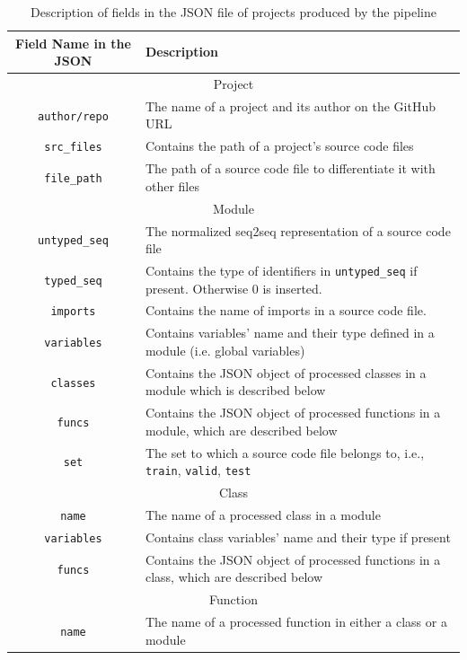 \documentclass[10pt, conference]{IEEEtran}
\begin{document}
\begin{table}[t]
	\centering
	\caption{Description of fields in the JSON file of projects produced by the pipeline}
	\label{tab:json-fields}
	\begin{tabular}{c l}
		\toprule
		Field Name in the JSON & Description \\
		\midrule
		\multicolumn{2}{c}{Project}  \\
		\midrule
		\texttt{author/repo} & The name of a project and its author on the GitHub URL  \\
		\midrule
		\texttt{src\_files} & Contains the path of a project's source code files \\
		\midrule
		\texttt{file\_path} & The path of a source code file to differentiate it with other files \\
		\midrule
		\multicolumn{2}{c}{Module}  \\
		\midrule
		\texttt{untyped\_seq} & The normalized seq2seq representation of a source code file \\
		\midrule
		\texttt{typed\_seq} & Contains the type of identifiers in \texttt{untyped\_seq} if present. Otherwise $0$ is inserted. \\
		\midrule
		\texttt{imports} & Contains the name of imports in a source code file. \\
		\midrule
		\texttt{variables} & Contains variables' name and their type defined in a module (i.e. global variables) \\
		\midrule
		\texttt{classes} & Contains the JSON object of processed classes in a module which is described below \\
		\midrule
		\texttt{funcs} &  Contains the JSON object of processed functions in a module, which are described below \\
		\midrule
		\texttt{set} & The set to which a source code file belongs to, i.e., \texttt{train}, \texttt{valid}, \texttt{test} \\
		\midrule
		\multicolumn{2}{c}{Class} \\
		\midrule
		\texttt{name} & The name of a processed class in a module \\
		\midrule
		\texttt{variables} & Contains class variables' name and their type if present \\
		\midrule
		\texttt{funcs} & Contains the JSON object of processed functions in a class, which are described below \\
		\midrule
		\multicolumn{2}{c}{Function} \\
		\midrule
		\texttt{name} & The name of a processed function in either a class or a module \\

\end{tabular}
\end{table}
\end{document}
